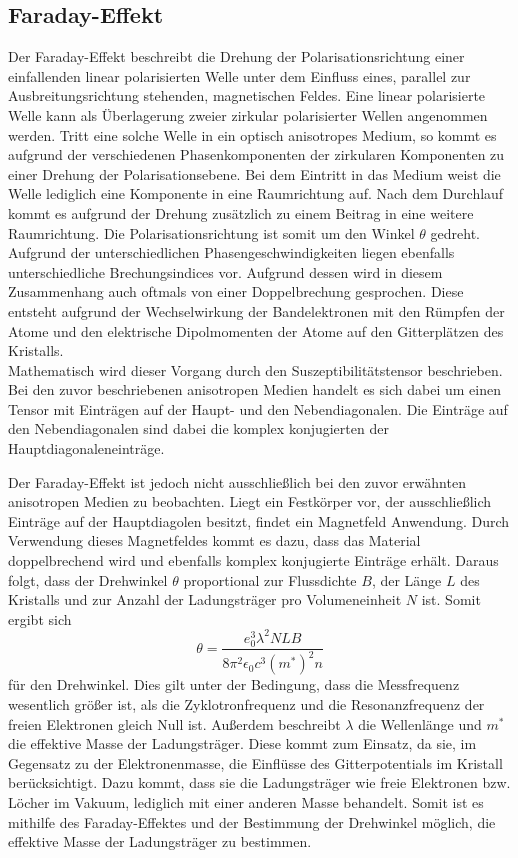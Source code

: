 \subsection{Faraday-Effekt}
Der Faraday-Effekt beschreibt die Drehung der Polarisationsrichtung einer einfallenden linear
polarisierten Welle unter dem Einfluss eines, parallel zur Ausbreitungsrichtung stehenden, magnetischen Feldes. Eine linear polarisierte Welle
kann als Überlagerung zweier zirkular polarisierter Wellen angenommen werden. Tritt eine solche Welle in
ein optisch anisotropes Medium, so kommt es aufgrund der verschiedenen Phasenkomponenten der zirkularen
Komponenten zu einer Drehung der Polarisationsebene. Bei dem Eintritt in das Medium weist die Welle
lediglich eine Komponente in eine Raumrichtung auf. Nach dem Durchlauf kommt es aufgrund der Drehung
zusätzlich zu einem Beitrag in eine weitere Raumrichtung. Die Polarisationsrichtung ist somit um den
Winkel $\theta$ gedreht. Aufgrund der unterschiedlichen Phasengeschwindigkeiten liegen ebenfalls
unterschiedliche Brechungsindices vor. Aufgrund dessen wird in diesem Zusammenhang auch oftmals von einer
Doppelbrechung gesprochen. Diese entsteht aufgrund der
Wechselwirkung der Bandelektronen mit den Rümpfen der Atome und
den elektrische Dipolmomenten der Atome auf den Gitterplätzen des Kristalls. \\
Mathematisch wird dieser Vorgang durch den Suszeptibilitätstensor beschrieben. Bei den zuvor beschriebenen
anisotropen Medien handelt es sich dabei um einen Tensor mit Einträgen auf der Haupt- und den Nebendiagonalen.
Die Einträge auf den Nebendiagonalen sind dabei die komplex konjugierten der Hauptdiagonaleneinträge. \\
\par
Der Faraday-Effekt ist jedoch nicht ausschließlich bei den zuvor erwähnten anisotropen Medien zu beobachten.
Liegt ein Festkörper vor, der ausschließlich Einträge auf der Hauptdiagolen besitzt, findet ein
Magnetfeld Anwendung. Durch Verwendung dieses Magnetfeldes kommt es dazu, dass das Material doppelbrechend wird
und ebenfalls komplex konjugierte Einträge erhält. Daraus folgt, dass der Drehwinkel $\theta$
proportional zur Flussdichte $B$, der Länge $L$ des Kristalls und zur Anzahl der Ladungsträger pro Volumeneinheit $N$
ist. Somit ergibt sich
\begin{equation}
    \theta = \frac{e_0^3 \lambda ^2 N L B}{8 \pi^2 \epsilon_0 c^3 (m^*)^2 n}
    \label{eqn:effmass}
\end{equation} \noindent
für den Drehwinkel. 
Dies gilt unter der Bedingung, dass die Messfrequenz wesentlich größer ist, als die Zyklotronfrequenz und die Resonanzfrequenz der freien Elektronen gleich Null ist.
Außerdem beschreibt $\lambda$ die Wellenlänge und $m^*$ die effektive Masse der
Ladungsträger. Diese kommt zum Einsatz, da sie, im Gegensatz zu der Elektronenmasse, die Einflüsse des
Gitterpotentials im Kristall berücksichtigt. Dazu kommt, dass sie die Ladungsträger wie freie Elektronen bzw.
Löcher im Vakuum, lediglich mit einer anderen Masse behandelt. Somit ist es mithilfe des Faraday-Effektes und der Bestimmung
der Drehwinkel möglich, die effektive Masse der Ladungsträger zu bestimmen.
